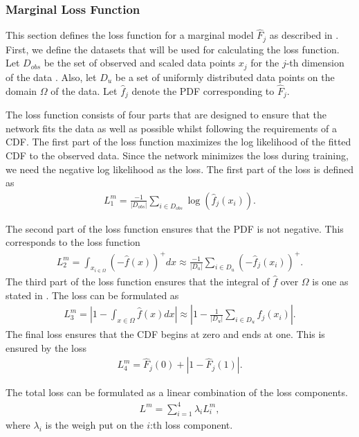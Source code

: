 \subsubsection{Marginal Loss Function}\label{sec:NeuralMarginalLoss}
This section defines the loss function for a marginal model $\hat{F}_j$ as described in . First, we define the datasets that will be used for calculating the loss function. Let $D_{obs}$ be the set of observed and scaled data points $x_j$ for the $j$-th dimension of the data . Also, let $D_u$ be a set of uniformly distributed data points on the domain $\Omega$  of the data. Let $\hat{f}_j$ denote the \gls{PDF} corresponding to $\hat{F}_j$.

The loss function consists of four parts that are designed to ensure that the network fits the data as well as possible whilst following the requirements of a \gls{CDF}. The first part of the loss function maximizes the log likelihood of the fitted \gls{CDF} to the observed data. Since the network minimizes the loss during training, we need the negative log likelihood as the loss. The first part of the loss is defined as 
\begin{align*}
    L_1^m = \frac{-1}{|D_{obs}|} \sum_{i \in D_{obs}} \log(\hat{f}_j(x_i)).
\end{align*}

The second part of the loss function ensures that the \gls{PDF} is not negative. This corresponds to the loss function 
\begin{align*}
    L_2^m = \int_{x_{i\in\Omega}} (-\hat{f}(x))^+dx \approx \frac{-1}{|D_{u}|} \sum_{i \in D_{u}} (-\hat{f}_j(x_i))^+.
\end{align*}
The third part of the loss function ensures that the integral of $\hat{f}$ over $\Omega$ is one as stated in . The loss can be formulated as 
\begin{align*}
    L_3^m = \left | 1- \int_{x\in \Omega} \hat{f}(x) dx    \right | \approx \left | 1- \frac{1}{|D_{u}|} \sum_{i \in D_{u}} \hat{f}_j(x_i)  \right |.
\end{align*}
The final loss ensures that the \gls{CDF} begins at zero and ends at one. This is ensured by the loss
\begin{align*}
    L_4^m = \hat{F}_j(0) + |1- \hat{F}_j(1) |.
\end{align*}

The total loss can be formulated as a linear combination of the loss components. 
\begin{align*}
    L^m = \sum_{i=1}^4 \lambda_i L_i^m,
\end{align*}
where $\lambda_i$ is the weigh put on the $i$:th loss component. 

